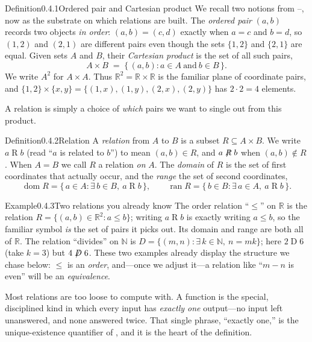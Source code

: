\documentclass[main.tex]{subfiles}
\begin{document}
\begin{Obj}{Definition}{0.4.1}{Ordered pair and Cartesian product}
We recall two notions from --, now as the substrate on which relations are
built. The \emph{ordered pair} $(a,b)$ records two objects \emph{in order}: $(a,b)=(c,d)$ exactly when
$a=c$ and $b=d$, so $(1,2)$ and $(2,1)$ are different pairs even though the sets $\{1,2\}$ and
$\{2,1\}$ are equal. Given sets $A$ and $B$, their \emph{Cartesian product} is the set of all such pairs,
\[
A\times B \;=\; \{\,(a,b) : a\in A \ \text{and}\ b\in B\,\}.
\]
We write $A^2$ for $A\times A$. Thus $\mathbb R^2=\mathbb R\times\mathbb R$ is the familiar plane of
coordinate pairs, and $\{1,2\}\times\{x,y\}=\{(1,x),(1,y),(2,x),(2,y)\}$ has $2\cdot 2=4$ elements.
\end{Obj}

\noindent A relation is simply a choice of \emph{which} pairs we want to single out from this product.

\begin{Obj}{Definition}{0.4.2}{Relation}
A \emph{relation} from $A$ to $B$ is a subset $R\subseteq A\times B$. We write $a\mathrel R b$ (read
``$a$ is related to $b$'') to mean $(a,b)\in R$, and $a\not\mathrel R b$ when $(a,b)\notin R$. When
$A=B$ we call $R$ a relation \emph{on} $A$. The \emph{domain} of $R$ is the set of first coordinates
that actually occur, and the \emph{range} the set of second coordinates,
\[
\operatorname{dom} R=\{\,a\in A : \exists\,b\in B,\ a\mathrel R b\,\},
\qquad
\operatorname{ran} R=\{\,b\in B : \exists\,a\in A,\ a\mathrel R b\,\}.
\]
\end{Obj}

\begin{ObjL}{Example}{0.4.3}{Two relations you already know}
The order relation ``$\le$'' on $\mathbb R$ is the relation $R=\{(a,b)\in\mathbb R^2 : a\le b\}$;
writing $a\mathrel R b$ is exactly writing $a\le b$, so the familiar symbol \emph{is} the set of pairs
it picks out. Its domain and range are both all of $\mathbb R$. The relation ``divides'' on
$\mathbb N$ is $D=\{(m,n) : \exists\,k\in\mathbb N,\ n=mk\}$; here $2\mathrel D 6$ (take $k=3$) but
$4\not\mathrel D 6$. These two examples already display the structure we chase below: $\le$ is an
\emph{order}, and---once we adjust it---a relation like ``$m-n$ is even'' will be an
\emph{equivalence}.
\end{ObjL}

\noindent Most relations are too loose to compute with. A function is the special, disciplined kind in
which every input has \emph{exactly one} output---no input left unanswered, and none answered twice.
That single phrase, ``exactly one,'' is the unique-existence quantifier of , and it is the
heart of the definition.
\end{document}
